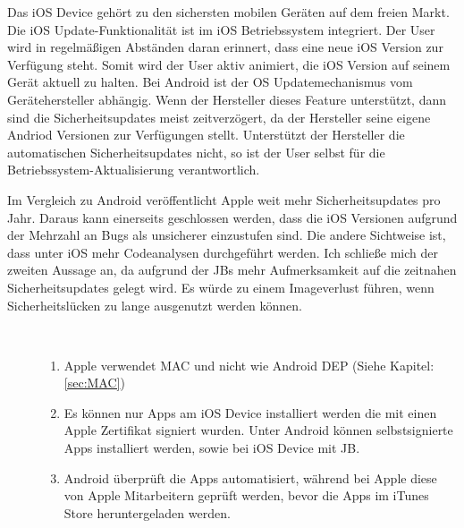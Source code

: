 Das iOS Device gehört zu den sichersten mobilen Geräten auf dem freien Markt. Die iOS Update-Funktionalität ist im iOS Betriebssystem integriert. Der User wird in regelmäßigen Abständen daran erinnert, dass eine neue iOS Version zur Verfügung steht. Somit wird der User aktiv animiert, die iOS Version auf seinem Gerät aktuell zu halten. Bei Android ist der OS Updatemechanismus vom Gerätehersteller abhängig. Wenn der Hersteller dieses Feature unterstützt, dann sind die Sicherheitsupdates meist zeitverzögert, da der Hersteller seine eigene Andriod Versionen zur Verfügungen stellt. Unterstützt der Hersteller die automatischen Sicherheitsupdates nicht, so ist der User selbst für die Betriebssystem-Aktualisierung verantwortlich.\par
 
Im Vergleich zu Android veröffentlicht Apple weit mehr Sicherheitsupdates pro Jahr. Daraus kann einerseits geschlossen werden, dass die iOS Versionen aufgrund der Mehrzahl an Bugs als unsicherer einzustufen sind. Die andere Sichtweise ist, dass unter iOS mehr Codeanalysen durchgeführt werden. Ich schließe mich der zweiten Aussage an, da aufgrund der JBs mehr Aufmerksamkeit auf die zeitnahen Sicherheitsupdates gelegt wird. Es würde zu einem Imageverlust führen, wenn Sicherheitslücken zu lange ausgenutzt werden können. \par
\begin{description}
    \item[\parbox{\textwidth} {Auch in Bezug auf die Sicherheitsmechanismen hat Apple weitere Vorteile gegenüber Android}]~\par
    \begin{enumerate}
        \item Apple verwendet MAC und nicht wie Android DEP (Siehe Kapitel: \ref{sec:MAC})
        \item Es können nur Apps am iOS Device installiert werden die mit einen Apple Zertifikat signiert wurden. Unter Android können selbstsignierte Apps installiert werden, sowie bei iOS Device mit JB.
        \item Android überprüft die Apps automatisiert, während bei Apple diese von Apple Mitarbeitern geprüft werden, bevor die Apps im iTunes Store heruntergeladen werden.  
    \end{enumerate}
\end{description} 

